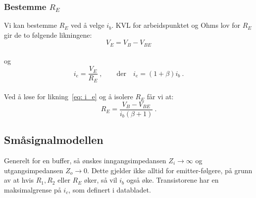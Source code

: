 \documentclass[a4paper,11pt,norsk]{article}
\begin{document}
\subsubsection{Bestemme $R_E$}\label{subsec: bestemme R_E}
Vi kan bestemme $R_E$ ved å velge $i_b$. KVL for arbeidspunktet og Ohms lov for $R_E$ gir de to følgende likningene:
\begin{equation} \label{eq: V_E}
    V_E = V_B - V_{BE}
\end{equation}\\
og
\begin{equation} \label{eq: i_e}
    i_e = \frac{V_E}{R_E} \: , \quad \quad \textrm{der} \quad i_e = (1+\beta)i_b \: .
\end{equation}\\
Ved å løse for likning~\ref{eq: i_e} og å isolere $R_E$ får vi at:
\begin{equation} \label{eq: R_E}
    R_E = \frac{V_B - V_{BE}}{i_b(\beta +1)} \: .
\end{equation}



\newpage
\subsection{Småsignalmodellen}
Generelt for en buffer, så ønskes inngangsimpedansen $Z_i \rightarrow \infty$ og utgangsimpedansen $Z_o \rightarrow 0$. Dette gjelder ikke alltid for emitter-følgere, på grunn av at hvis $R_1, R_2$ eller $R_E$ øker, så vil $i_b$ også øke. Transistorene har en maksimalgrense på $i_c$, som definert i databladet. 
\end{document}
